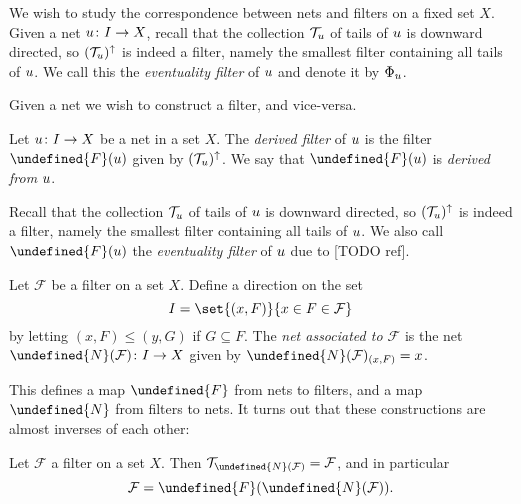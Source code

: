 \documentclass[article, a4paper, 11pt, oneside]{memoir}
\let\mathfrak\undefined
\numberwithin{equation}{chapter}
\newcommand{\calT}{\mathcal{T}}
\newcommand{\calF}{\mathcal{F}}
\theoremstyle{nonumberplain}
\begin{document}
\newcommand{\filter}{\mathfrak{F}}
\newcommand{\net}{\mathfrak{N}}

\newcommand{\evfilt}[1]{\Phi_{#1}}

We wish to study the correspondence between nets and filters on a fixed set $X$. Given a net $u \colon I \to X$, recall that the collection $\tails{\mynet}$ of tails of $u$ is downward directed, so $(\tails{\mynet})^\uparrow$ is indeed a filter, namely the smallest filter containing all tails of $u$. We call this the \emph{eventuality filter} of $u$ and denote it by $\evfilt{\mynet}$.



Given a net we wish to construct a filter, and vice-versa.


\begin{definition}
    Let $u \colon I \to X$ be a net in a set $X$. The \emph{derived filter} of $u$ is the filter $\filter(\mynet)$ given by $(\tails{\mynet})^\uparrow$. We say that $\filter(\mynet)$ is \emph{derived from} $u$.
\end{definition}
%
Recall that the collection $\tails{\mynet}$ of tails of $u$ is downward directed, so $(\tails{\mynet})^\uparrow$ is indeed a filter, namely the smallest filter containing all tails of $u$. We also call $\filter(\mynet)$ the \emph{eventuality filter} of $u$ due to [TODO ref].

\begin{definition}
    Let $\calF$ be a filter on a set $X$. Define a direction on the set
    \begin{equation*}
        I
            = \set{(x,F)}{x \in F \in \calF}
    \end{equation*}
    by letting $(x,F) \leq (y,G)$ if $G \subseteq F$. The \emph{net associated to $\calF$} is the net $\net(\calF) \colon I \to X$ given by $\net(\calF)_{(x,F)} = x$.
\end{definition}

This defines a map $\filter$ from nets to filters, and a map $\net$ from filters to nets. It turns out that these constructions are almost inverses of each other:

\begin{proposition}
    Let $\calF$ a filter on a set $X$. Then $\calT_{\net(\calF)} = \calF$, and in particular
    \begin{equation*}
        \calF
            = \filter(\net(\calF)).
    \end{equation*}
\end{proposition}
\end{document}
